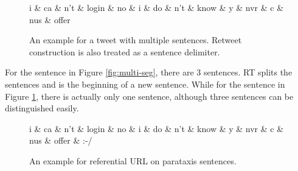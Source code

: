 \documentclass[11pt,a4paper]{article}
\begin{document}
\begin{figure}[t]
	\centering
	\small
	\begin{dependency}[edge slant=2, text only label, label style=above]
		\begin{deptext}
			i \& ca \& n't \& login \& no \& i \& do \& n't \& know \& y \& nvr \& c \& nus \& offer \\
		\end{deptext}
	\end{dependency}
	\caption{An example for a tweet with multiple sentences. 
		Retweet  construction is also treated as a sentence delimiter.}\label{fig:single-seg}
\end{figure}

For the sentence in Figure \ref{fig:multi-seg},  there are 3 sentences.
RT splits the sentences and is the beginning of a new sentence.
While for the sentence in Figure \ref{fig:single-seg},
there is actually only one sentence, although three sentences can be distinguished easily. 

\begin{figure}[t]
	\centering
	\small
	\begin{dependency}[edge slant=2, text only label, label style=above]
		\begin{deptext}
			i \& ca \& n't \& login \& no \& i \& do \& n't \& know \& y \& nvr \& c \& nus \& offer  \& :-/ \\
		\end{deptext}
	\end{dependency}
	\caption{An example for referential URL on parataxis sentences.}\label{fig:ref-url-on-para-sent}
\end{figure}
\end{document}

